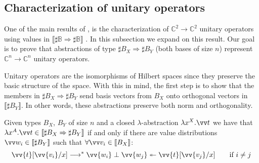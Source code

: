 \documentclass[runningheads,orivec,envcountsame,envcountsect]{llncs}
\newcommand\lra{\longrightarrow}
\def\C{\mathbb{C}}            %
\def\Lam#1#2#3{\lambda#1^{#2}{.}#3} %
\def\eval{\lra^*}
\def\Arr{\Rightarrow}
\def\sem#1{\llbracket#1\rrbracket}
\newcommand\B{\mathbb B}
\newcommand\basis[1]{\ensuremath{B_{ #1 }}}
\begin{document}
\subsection{Characterization of unitary operators}


One of the main results of \cite{DiazcaroGuillermoMiquelValironLICS19}, is the characterization of $\C^2\to\C^2$ unitary operators using values in $\sem{\sharp\B\Arr\sharp\B}$ \cite[Theorem IV.12]{DiazcaroGuillermoMiquelValironLICS19}. In this subsection we expand on this result. Our goal is to prove that abstractions of type $\sharp\basis{X}\Arr\sharp\basis{Y}$ (both bases of size $n$) represent $\C^n\to\C^n$ unitary operators.

Unitary operators are the isomorphisms of Hilbert spaces since they preserve the basic structure of the space. With this in mind, the first step is to show that the members in $\sharp\basis{X}\Arr\sharp{\basis{Y}}$ send basis vectors from $\basis{X}$ onto orthogonal vectors in $\sem{\sharp\basis{Y}}$. In other words, these abstractions preserve both norm and orthogonality.

\begin{lemma}\label{lem:BasesIso}
  Given types $\basis{X}$, $\basis{Y}$ of size $n$ and a closed $\lambda$-abstraction $\Lam{x}{X}{\vv t}$ we have that $\Lam{x}{A}{\vv t}\in\sem{\sharp\basis{X}\Arr\sharp\basis{Y}}$ if and only if there are value distributions $\vv w_i\in\sem{\sharp\basis{Y}}$ such that $\forall\vv v_i\in\sem{\basis{X}}$:
  \[
    \vv{t}[\vv{v_i}/x]\eval\vv{w_i}\perp\vv{w_j}\twoheadleftarrow \vv{t}[\vv{v_j}/x] \qquad \text{if } i\neq j
  \]
\end{lemma}
\end{document}
